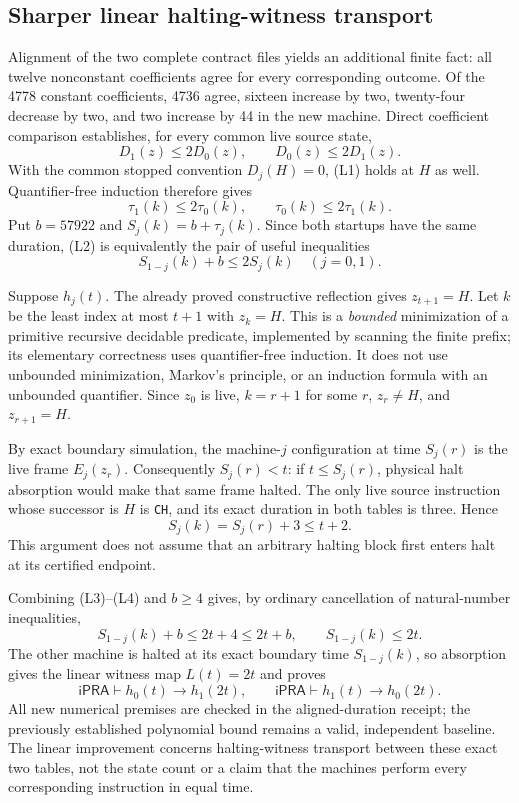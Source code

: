\subsection{Sharper linear halting-witness transport}
\label{sec:linear-witness}

Alignment of the two complete contract files yields an additional finite
fact: all twelve nonconstant coefficients agree for every corresponding
outcome.  Of the 4778 constant coefficients, 4736 agree, sixteen increase
by two, twenty-four decrease by two, and two increase by 44 in the new
machine.  Direct coefficient comparison establishes, for every common
live source state,
\[
 D_1(z)\le2D_0(z),\qquad D_0(z)\le2D_1(z).             \tag{L1}
\]
With the common stopped convention $D_j(H)=0$, (L1) holds at $H$ as
well.  Quantifier-free induction therefore gives
\[
 \tau_1(k)\le2\tau_0(k),\qquad \tau_0(k)\le2\tau_1(k).
                                                               \tag{L2}
\]
Put $b=57922$ and $S_j(k)=b+\tau_j(k)$.  Since both startups have
the same duration, (L2) is equivalently the pair of useful inequalities
\[
                S_{1-j}(k)+b\le2S_j(k)\quad(j=0,1).    \tag{L3}
\]

Suppose $h_j(t)$.  The already proved constructive reflection gives
$z_{t+1}=H$.  Let $k$ be the least index at most $t+1$ with $z_k=H$.
This is a \emph{bounded} minimization of a primitive recursive decidable
predicate, implemented by scanning the finite prefix; its elementary
correctness uses quantifier-free induction.  It does not use unbounded
minimization, Markov's principle, or an induction formula with an
unbounded quantifier.  Since $z_0$ is live, $k=r+1$ for some $r$,
$z_r\ne H$, and $z_{r+1}=H$.

By exact boundary simulation, the machine-$j$ configuration at time
$S_j(r)$ is the live frame $E_j(z_r)$.  Consequently
$S_j(r)<t$: if $t\le S_j(r)$, physical halt absorption would make that
same frame halted.  The only live source instruction whose successor is
$H$ is \texttt{CH}, and its exact duration in both tables is three.
Hence
\[
                     S_j(k)=S_j(r)+3\le t+2.           \tag{L4}
\]
This argument does not assume that an arbitrary halting block first
enters halt at its certified endpoint.

Combining (L3)--(L4) and $b\ge4$ gives, by ordinary cancellation of
natural-number inequalities,
\[
 S_{1-j}(k)+b\le2t+4\le2t+b,
 \qquad S_{1-j}(k)\le2t.
\]
The other machine is halted at its exact boundary time $S_{1-j}(k)$,
so absorption gives the linear witness map $L(t)=2t$ and proves
\[
 \boxed{\mathsf{iPRA}\vdash h_0(t)\to h_1(2t),\qquad
        \mathsf{iPRA}\vdash h_1(t)\to h_0(2t).}         \tag{L5}
\]
All new numerical premises are checked in the aligned-duration receipt;
the previously established polynomial bound remains a valid, independent
baseline.  The linear improvement concerns halting-witness transport
between these exact two tables, not the state count or a claim that the
machines perform every corresponding instruction in equal time.
